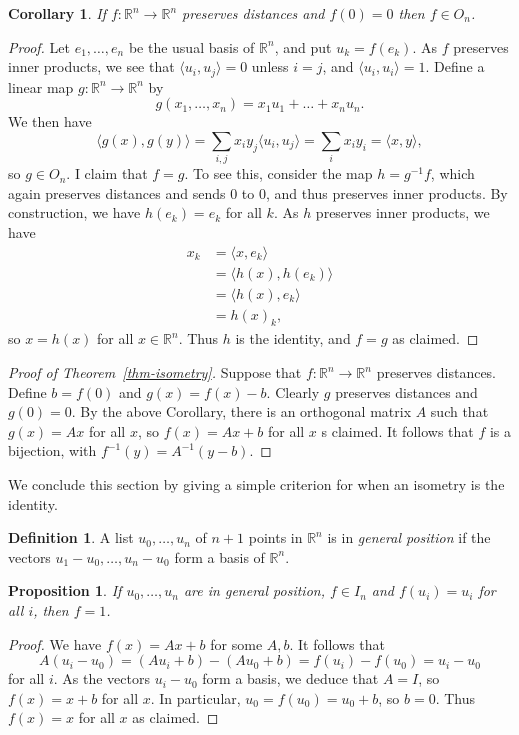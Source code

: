 \documentclass{amsart}
\newcommand{\R}         {{\mathbb{R}}}
\newcommand{\ip}[1]     {\langle #1\rangle}
\newcommand{\xra}       {\xrightarrow}
\renewcommand{\:}       {\colon}
\newtheorem{proposition}[theorem]{Proposition}
\newtheorem{corollary}[theorem]{Corollary}
\theoremstyle{definition}
\newtheorem{definition}[theorem]{Definition}
\begin{document}
\begin{corollary}\label{cor-isometry}
 If $f\:\R^n\xra{}\R^n$ preserves distances and $f(0)=0$ then
 $f\in O_n$.
\end{corollary}
\begin{proof}
 Let $e_1,\ldots,e_n$ be the usual basis of $\R^n$, and put
 $u_k=f(e_k)$.  As $f$ preserves inner products, we see that
 $\ip{u_i,u_j}=0$ unless $i=j$, and $\ip{u_i,u_i}=1$.  Define a linear
 map $g\:\R^n\xra{}\R^n$ by
 \[ g(x_1,\ldots,x_n) = x_1u_1 + \ldots + x_nu_n.  \]
 We then have
 \[ \ip{g(x),g(y)} = \sum_{i,j} x_iy_j \ip{u_i,u_j} =
      \sum_i x_iy_i = \ip{x,y},
 \]
 so $g\in O_n$.  I claim that $f=g$.  To see this, consider the map
 $h=g^{-1}f$, which again preserves distances and sends $0$ to $0$,
 and thus preserves inner products.  By construction, we have
 $h(e_k)=e_k$ for all $k$.  As $h$ preserves inner products, we have
 \begin{align*}
  x_k &= \ip{x,e_k} \\
      &= \ip{h(x),h(e_k)} \\
      &= \ip{h(x),e_k} \\
      &= h(x)_k,
 \end{align*}
 so $x=h(x)$ for all $x\in\R^n$.  Thus $h$ is the identity, and $f=g$
 as claimed.
\end{proof}

\begin{proof}[Proof of Theorem~\ref{thm-isometry}]
 Suppose that $f\:\R^n\xra{}\R^n$ preserves distances.  Define
 $b=f(0)$ and $g(x)=f(x)-b$.  Clearly $g$ preserves distances and
 $g(0)=0$.  By the above Corollary, there is an orthogonal matrix $A$
 such that $g(x)=Ax$ for all $x$, so $f(x)=Ax+b$ for all $x$ s
 claimed.  It follows that $f$ is a bijection, with
 $f^{-1}(y)=A^{-1}(y-b)$.
\end{proof}

We conclude this section by giving a simple criterion for when an
isometry is the identity.
\begin{definition}
 A list $u_0,\ldots,u_n$ of $n+1$ points in $\R^n$ is in \emph{general
 position} if the vectors $u_1-u_0,\ldots,u_n-u_0$ form a basis of
 $\R^n$.
\end{definition}

\begin{proposition}\label{prop-gen-pos}
 If $u_0,\ldots,u_n$ are in general position, $f\in I_n$ and
 $f(u_i)=u_i$ for all $i$, then $f=1$.
\end{proposition}
\begin{proof}
 We have $f(x)=Ax+b$ for some $A,b$.  It follows that
 \[ A(u_i-u_0) = (Au_i+b)-(Au_0+b) = f(u_i)-f(u_0) = u_i-u_0 \]
 for all $i$.  As the vectors $u_i-u_0$ form a basis, we deduce that
 $A=I$, so $f(x)=x+b$ for all $x$.  In particular, $u_0=f(u_0)=u_0+b$,
 so $b=0$.  Thus $f(x)=x$ for all $x$ as claimed.
\end{proof}
\end{document}
